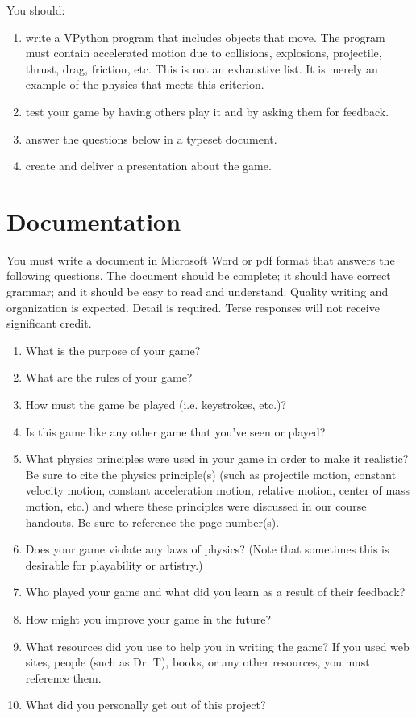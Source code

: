 \noindent
You should:

\begin{enumerate}
	\item write a VPython program that includes objects that move. The program must contain accelerated motion due to collisions, explosions, projectile, thrust, drag, friction, etc. This is not an exhaustive list. It is merely an example of the physics that meets this criterion.
	\item test your game by having others play it and by asking them for feedback.
	\item answer the questions below in a typeset document.
	\item create and deliver a presentation about the game.
\end{enumerate}

\section*{Documentation}

You must write a document in Microsoft Word or pdf format that answers the following questions. The document should be complete; it should have correct grammar; and it should be easy to read and understand. Quality writing and organization is expected. Detail is required. Terse responses will not receive significant credit. 

\begin{enumerate}
	\item What is the purpose of your game?
	\item What are the rules of your game?
	\item How must the game be played (i.e. keystrokes, etc.)?
	\item Is this game like any other game that you've seen or played?
	\item What physics principles were used in your game in order to make it realistic?  Be sure to cite the physics principle(s) (such as projectile motion, constant velocity motion, constant acceleration motion, relative motion, center of mass motion, etc.) and where these principles were discussed in our course handouts. Be sure to reference the page number(s).
	\item Does your game violate any laws of physics? (Note that sometimes this is desirable for playability or artistry.)
	\item Who played your game and what did you learn as a result of their feedback?
	\item How might you improve your game in the future?
	\item What resources did you use to help you in writing the game?  If you used web sites, people (such as Dr. T), books, or any other resources, you must reference them.
	\item What did you personally get out of this project?
\end{enumerate}

